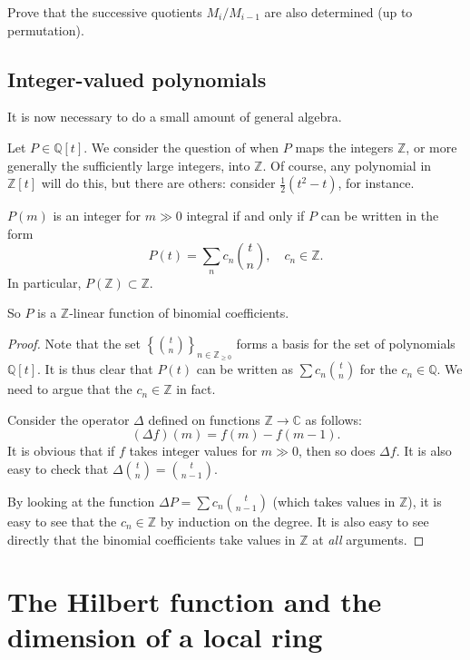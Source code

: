 \begin{exercise} 
Prove that the successive quotients $M_i/M_{i-1}$ are also determined (up to
permutation).
\end{exercise} 

\subsection{Integer-valued polynomials}

It is now necessary to do a small amount of general algebra.

Let $P \in \mathbb{Q}[t]$. We consider the question of when $P$ maps the
integers $\mathbb{Z}$, or more generally the sufficiently large integers, into
$\mathbb{Z}$. Of course, any polynomial in $\mathbb{Z}[t]$ will do this, but
there are others: consider $\frac{1}{2}(t^2 -t)$, for instance.

\begin{proposition}\label{integervalued} 
$P(m)$ is an integer for $m \gg 0$ integral if and only if
$P$ can be written in the form
\[ P(t) = \sum_n c_n \binom{t}{n}, \quad c_n \in \mathbb{Z}.  \]
In particular, $P(\mathbb{Z}) \subset \mathbb{Z}$.
\end{proposition} 
So $P$ is a $\mathbb{Z}$-linear function of binomial coefficients. 
\begin{proof} 
Note that the set $\left\{\binom{t}{n}\right\}_{n \in \mathbb{Z}_{\geq 0}}$ forms a basis for the set of
polynomials $\mathbb{Q}[t]$. It is thus clear that $P(t)$ can be written as
$\sum c_n \binom{t}{n}$ for the $c_n \in \mathbb{Q}$.
We need to argue that the $c_n \in \mathbb{Z}$ in fact.

Consider the operator $\Delta$ defined on functions $\mathbb{Z} \to
\mathbb{C}$ as follows:
\[( \Delta f)(m) = f(m) - f(m-1).  \]
It is obvious that if $f$ takes integer values for $m \gg 0$, then so does
$\Delta f$. It is also easy to check that $\Delta \binom{t}{n} =
\binom{t}{n-1}$.

By looking at the
function $\Delta P = \sum c_n \binom{t}{n-1}$ (which takes values in $\mathbb{Z}$), it is easy to see that the $c_n \in \mathbb{Z}$ by induction
on the degree. 
It is also easy to see directly that the binomial coefficients take values in
$\mathbb{Z}$ at \emph{all} arguments.
\end{proof} 



\section{The Hilbert function and the dimension of a local ring}

